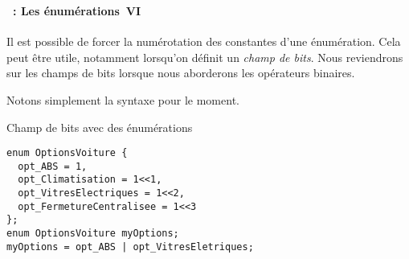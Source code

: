 \begin{frame}[containsverbatim]
  \frametitle{\secname}
  \framesubtitle{\subsecname~: Les énumérations~VI} 

  Il est possible de forcer la numérotation des constantes d'une énumération. Cela peut être utile, notamment lorsqu'on
  définit un \textit{champ de bits}. Nous reviendrons sur les champs de bits lorsque nous aborderons les opérateurs
  binaires.
  \vspace{0.3cm}
  \par
  Notons simplement la syntaxe pour le moment.
  \begin{exampleblock}{Champ de bits avec des énumérations}
    \begin{verbatim}
enum OptionsVoiture {
  opt_ABS = 1,
  opt_Climatisation = 1<<1,
  opt_VitresElectriques = 1<<2,
  opt_FermetureCentralisee = 1<<3
};
enum OptionsVoiture myOptions;
myOptions = opt_ABS | opt_VitresEletriques;\end{verbatim}
  \end{exampleblock}
\end{frame}

